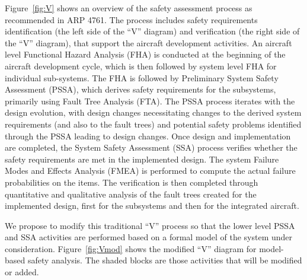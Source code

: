 
Figure~\ref{fig:V} shows an overview of the safety assessment
process as recommended in ARP 4761. The process includes safety
requirements identification (the left side of the ``V'' diagram)
and verification (the right side of the ``V'' diagram), that
support the aircraft development activities. An aircraft level
Functional Hazard Analysis (FHA) is conducted at the beginning of
the aircraft development cycle, which is then followed by system
level FHA for individual sub-systems. The FHA is followed by
Preliminary System Safety Assessment (PSSA), which derives safety
requirements for the subsystems, primarily using Fault Tree
Analysis (FTA). The PSSA process iterates with the design
evolution, with design changes necessitating changes to the
derived system requirements (and also to the fault trees) and
potential safety problems identified through the PSSA leading to
design changes. Once design and implementation are completed, the
System Safety Assessment (SSA) process verifies whether the safety
requirements are met in the implemented design. The system Failure
Modes and Effects Analysis (FMEA) is performed to compute the
actual failure probabilities on the items. The verification is
then completed through quantitative and qualitative analysis of
the fault trees created for the implemented design, first for the
subsystems and then for the integrated aircraft.


We propose to modify this traditional ``V'' process so that the
lower level PSSA and SSA activities are performed based on a
formal model of the system under consideration.
Figure~\ref{fig:Vmod} shows the modified ``V'' diagram for
model-based safety analysis. The shaded blocks are those
activities that will be modified or added.

